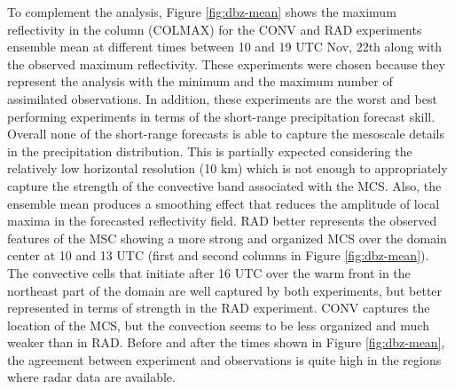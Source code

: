 \documentclass[final,5p,times,twocolumn,authoryear]{elsarticle} %
\begin{document}
To complement the analysis, Figure \ref{fig:dbz-mean} shows the maximum reflectivity in the column (COLMAX) for the CONV and RAD experiments ensemble mean at different times between 10 and 19 UTC Nov, 22th along with the observed maximum reflectivity. These experiments were chosen because they represent the analysis with the minimum and the maximum number of assimilated observations. In addition, these experiments are the worst and best performing experiments in terms of the short-range precipitation forecast skill. Overall none of the short-range forecasts is able to capture the mesoscale details in the precipitation distribution. This is partially expected considering the relatively low horizontal resolution (10 km) which is not enough to appropriately capture the strength of the convective band associated with the MCS. Also, the ensemble mean produces a smoothing effect that reduces the amplitude of local maxima in the forecasted reflectivity field. RAD better represents the observed features of the MSC showing a more strong and organized MCS over the domain center at 10 and 13 UTC (first and second columns in Figure \ref{fig:dbz-mean}). The convective cells that initiate after 16 UTC over the warm front in the northeast part of the domain are well captured by both experiments, but better represented in terms of strength in the RAD experiment. CONV captures the location of the MCS, but the convection seems to be less organized and much weaker than in RAD. Before and after the times shown in Figure \ref{fig:dbz-mean}, the agreement between experiment and observations is quite high in the regions where radar data are available.
\end{document}
